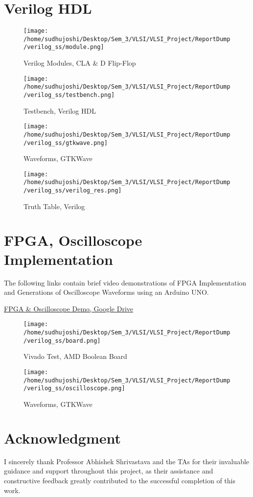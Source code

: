 \documentclass[conference]{IEEEtran}
\begin{document}
\section{Verilog HDL}
\begin{figure}[H] 
    \centering
    \texttt{[image: /home/sudhujoshi/Desktop/Sem\_3/VLSI/VLSI\_Project/ReportDump/verilog\_ss/module.png]}
    \caption{Verilog Modules, CLA \& D Flip-Flop} 
\end{figure}
\begin{figure}[H] 
    \centering
    \texttt{[image: /home/sudhujoshi/Desktop/Sem\_3/VLSI/VLSI\_Project/ReportDump/verilog\_ss/testbench.png]}
    \caption{Testbench, Verilog HDL} 
\end{figure}
\begin{figure}[H] 
    \centering
    \texttt{[image: /home/sudhujoshi/Desktop/Sem\_3/VLSI/VLSI\_Project/ReportDump/verilog\_ss/gtkwave.png]}
    \caption{Waveforms, GTKWave} 
\end{figure}
\begin{figure}[H] 
    \centering
    \texttt{[image: /home/sudhujoshi/Desktop/Sem\_3/VLSI/VLSI\_Project/ReportDump/verilog\_ss/verilog\_res.png]}
    \caption{Truth Table, Verilog} 
\end{figure}


\section{FPGA, Oscilloscope Implementation}
The following links contain brief video demonstrations of FPGA Implementation and 
Generations of Oscilloscope Waveforms using an Arduino UNO.

\href{https://drive.google.com/drive/folders/15TUTqYzhG3WnAiuiNixyvRwzI8kM6A_v?usp=drive_link}
{FPGA \& Oscilloscope Demo, Google Drive}

\begin{figure}[H] 
    \centering
    \texttt{[image: /home/sudhujoshi/Desktop/Sem\_3/VLSI/VLSI\_Project/ReportDump/verilog\_ss/board.png]}
    \caption{Vivado Test, AMD Boolean Board} 
\end{figure}
\begin{figure}[H] 
    \centering
    \texttt{[image: /home/sudhujoshi/Desktop/Sem\_3/VLSI/VLSI\_Project/ReportDump/verilog\_ss/oscilloscope.png]}
    \caption{Waveforms, GTKWave} 
\end{figure}

\section*{Acknowledgment}
I sincerely thank Professor Abhishek Shrivastava and the TAs for their invaluable 
guidance and support throughout this project, as their assistance and constructive 
feedback greatly contributed to the successful completion of this work.
\end{document}
